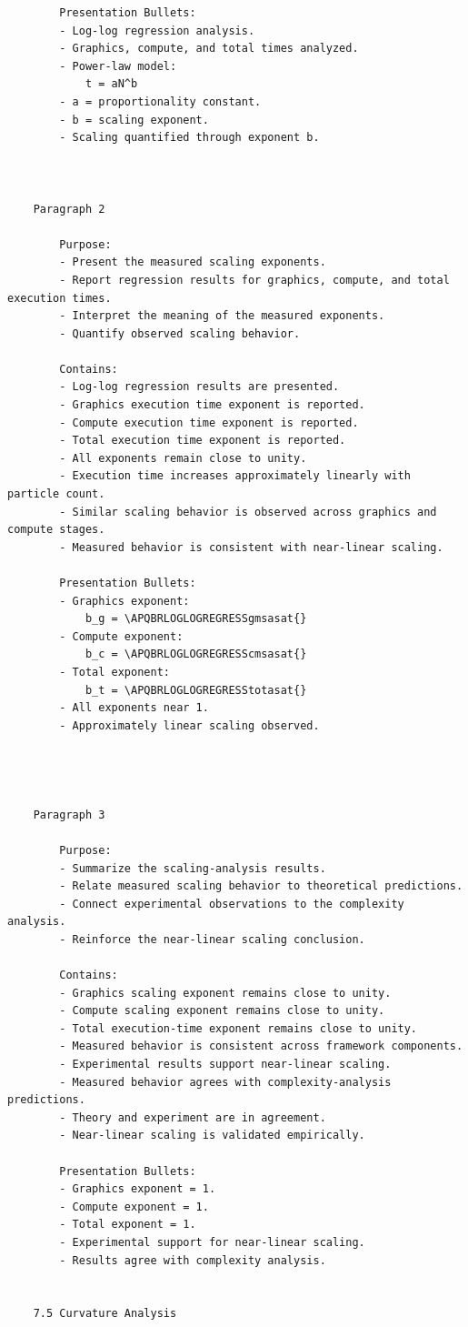 \begin{verbatim}
		Presentation Bullets:
		- Log-log regression analysis.
		- Graphics, compute, and total times analyzed.
		- Power-law model:
			t = aN^b
		- a = proportionality constant.
		- b = scaling exponent.
		- Scaling quantified through exponent b.		



	Paragraph 2

		Purpose:
		- Present the measured scaling exponents.
		- Report regression results for graphics, compute, and total execution times.
		- Interpret the meaning of the measured exponents.
		- Quantify observed scaling behavior.

		Contains:
		- Log-log regression results are presented.
		- Graphics execution time exponent is reported.
		- Compute execution time exponent is reported.
		- Total execution time exponent is reported.
		- All exponents remain close to unity.
		- Execution time increases approximately linearly with particle count.
		- Similar scaling behavior is observed across graphics and compute stages.
		- Measured behavior is consistent with near-linear scaling.

		Presentation Bullets:
		- Graphics exponent:
			b_g = \APQBRLOGLOGREGRESSgmsasat{}
		- Compute exponent:
			b_c = \APQBRLOGLOGREGRESScmsasat{}
		- Total exponent:
			b_t = \APQBRLOGLOGREGRESStotasat{}
		- All exponents near 1.
		- Approximately linear scaling observed.		
		
		


	Paragraph 3

		Purpose:
		- Summarize the scaling-analysis results.
		- Relate measured scaling behavior to theoretical predictions.
		- Connect experimental observations to the complexity analysis.
		- Reinforce the near-linear scaling conclusion.

		Contains:
		- Graphics scaling exponent remains close to unity.
		- Compute scaling exponent remains close to unity.
		- Total execution-time exponent remains close to unity.
		- Measured behavior is consistent across framework components.
		- Experimental results support near-linear scaling.
		- Measured behavior agrees with complexity-analysis predictions.
		- Theory and experiment are in agreement.
		- Near-linear scaling is validated empirically.

		Presentation Bullets:
		- Graphics exponent = 1.
		- Compute exponent = 1.
		- Total exponent = 1.
		- Experimental support for near-linear scaling.
		- Results agree with complexity analysis.		
		
		
	7.5 Curvature Analysis
	

\end{verbatim}
